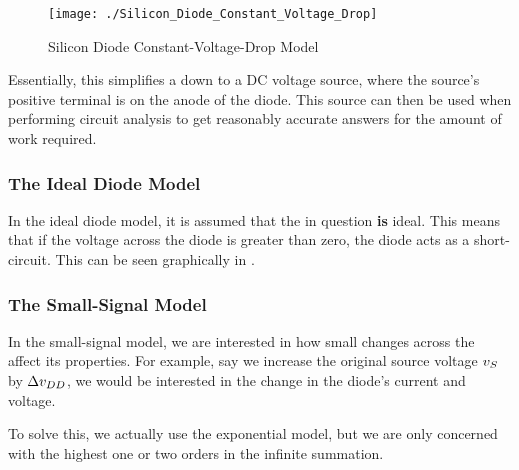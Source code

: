 \begin{figure}[h!tbp]
  \centering
  \texttt{[image: ./Silicon\_Diode\_Constant\_Voltage\_Drop]}
  \caption{Silicon Diode Constant-Voltage-Drop Model \parencite[p.~193]{sedraTextbook7}}
  \label{fig:Silicon_Diode_Constant_Voltage_Drop}
\end{figure}

Essentially, this simplifies a  down to a DC voltage source, where the source's positive terminal is on the anode of the diode.
This source can then be used when performing circuit analysis to get reasonably accurate answers for the amount of work required.

\subsubsection{The Ideal Diode Model}\label{subsubsec:Ideal_Diode_Model}
In the ideal diode model, it is assumed that the  in question \textbf{is} ideal.
This means that if the voltage across the diode is greater than zero, the diode acts as a short-circuit.
This can be seen graphically in .

\subsubsection{The Small-Signal Model}\label{subsubsec:Diode_Small-Signal_Model}
In the small-signal model, we are interested in how small changes across the  affect its properties.
For example, say we increase the original source voltage $v_{S}$ by $\Delta v_{DD}$, we would be interested in the change in the diode's current and voltage.

To solve this, we actually use the exponential model, but we are only concerned with the highest one or two orders in the infinite summation.


